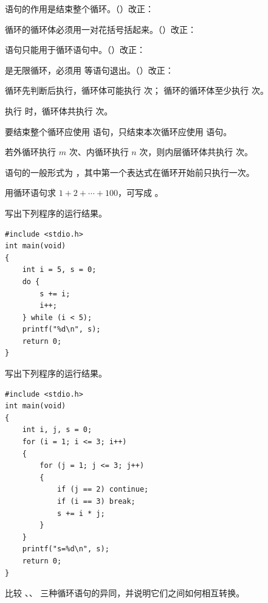\documentclass[a4paper,11pt]{article}
\begin{document}
\q {} 语句的作用是结束整个循环。\quad（\quad）\quad 改正：\fixblank

\q {} 循环的循环体必须用一对花括号括起来。\quad（\quad）\quad 改正：\fixblank

\q {} 语句只能用于循环语句中。\quad（\quad）\quad 改正：\fixblank

\q {} 是无限循环，必须用  等语句退出。\quad（\quad）\quad 改正：\fixblank


\q {} 循环先判断后执行，循环体可能执行 \fillblank{} 次； 循环的循环体至少执行 \fillblank{} 次。

\q 执行  时，循环体共执行 \fillblank{} 次。

\q 要结束整个循环应使用 \fillblank{} 语句，只结束本次循环应使用 \fillblank{} 语句。

\q 若外循环执行 $m$ 次、内循环执行 $n$ 次，则内层循环体共执行 \fillblank{} 次。

\q {} 语句的一般形式为 \fillblanks[1.4cm]\code{;}\fillblanks[1.4cm]\code{;}\fillblanks[1.4cm]\code{)}，其中第一个表达式在循环开始前只执行一次。

\q 用循环语句求 $1+2+\cdots+100$，可写成 \fillblank{}\code{;}。


\q 写出下列程序的运行结果。
\begin{lstlisting}[language={[custom]C}]
#include <stdio.h>
int main(void)
{
    int i = 5, s = 0;
    do {
        s += i;
        i++;
    } while (i < 5);
    printf("%d\n", s);
    return 0;
}
\end{lstlisting}
\anslines{2.4cm}

\q 写出下列程序的运行结果。
\begin{lstlisting}[language={[custom]C}]
#include <stdio.h>
int main(void)
{
    int i, j, s = 0;
    for (i = 1; i <= 3; i++)
    {
        for (j = 1; j <= 3; j++)
        {
            if (j == 2) continue;
            if (i == 3) break;
            s += i * j;
        }
    }
    printf("s=%d\n", s);
    return 0;
}
\end{lstlisting}
\anslines{2.6cm}


\q 比较 、、 三种循环语句的异同，并说明它们之间如何相互转换。\anslines{3.4cm}
\end{document}
